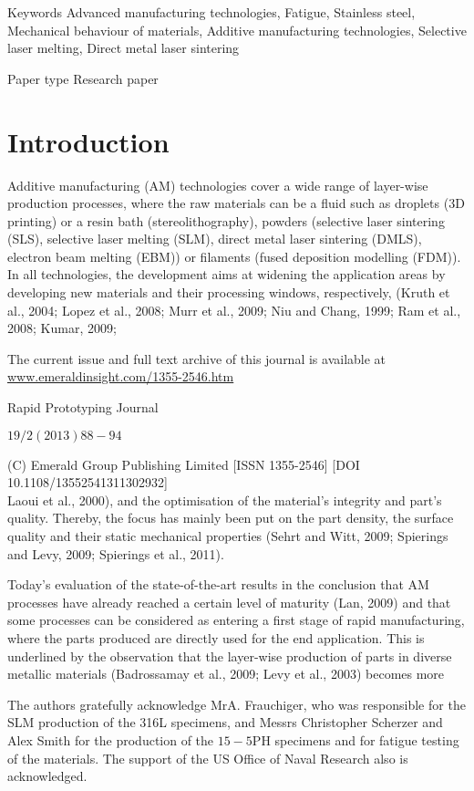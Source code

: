 \documentclass[10pt]{article}
\begin{document}
Keywords Advanced manufacturing technologies, Fatigue, Stainless steel, Mechanical behaviour of materials, Additive manufacturing technologies, Selective laser melting, Direct metal laser sintering

Paper type Research paper

\section*{Introduction}
Additive manufacturing (AM) technologies cover a wide range of layer-wise production processes, where the raw materials can be a fluid such as droplets (3D printing) or a resin bath (stereolithography), powders (selective laser sintering (SLS), selective laser melting (SLM), direct metal laser sintering (DMLS), electron beam melting (EBM)) or filaments (fused deposition modelling (FDM)). In all technologies, the development aims at widening the application areas by developing new materials and their processing windows, respectively, (Kruth et al., 2004; Lopez et al., 2008; Murr et al., 2009; Niu and Chang, 1999; Ram et al., 2008; Kumar, 2009;

The current issue and full text archive of this journal is available at \href{http://www.emeraldinsight.com/1355-2546.htm}{www.emeraldinsight.com/1355-2546.htm}

Rapid Prototyping Journal

$19 / 2(2013) 88-94$

(C) Emerald Group Publishing Limited [ISSN 1355-2546] [DOI 10.1108/13552541311302932]\\
Laoui et al., 2000), and the optimisation of the material's integrity and part's quality. Thereby, the focus has mainly been put on the part density, the surface quality and their static mechanical properties (Sehrt and Witt, 2009; Spierings and Levy, 2009; Spierings et al., 2011).

Today's evaluation of the state-of-the-art results in the conclusion that AM processes have already reached a certain level of maturity (Lan, 2009) and that some processes can be considered as entering a first stage of rapid manufacturing, where the parts produced are directly used for the end application. This is underlined by the observation that the layer-wise production of parts in diverse metallic materials (Badrossamay et al., 2009; Levy et al., 2003) becomes more

The authors gratefully acknowledge $\mathrm{Mr} \mathrm{A}$. Frauchiger, who was responsible for the SLM production of the 316L specimens, and Messrs Christopher Scherzer and Alex Smith for the production of the $15-5 \mathrm{PH}$ specimens and for fatigue testing of the materials. The support of the US Office of Naval Research also is acknowledged.
\end{document}
